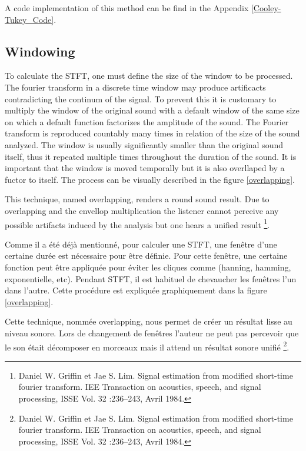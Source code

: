 A code implementation of this method can be find in the Appendix \ref{Cooley-Tukey_Code}.

\subsection{Windowing}

To calculate the STFT, one must define the size of the window to be processed. The fourier transform in a discrete time window may produce artificacts contradicting the continum of the signal. To prevent this it is customary to multiply the window of the original sound with a default window of the same size on which a default function factorizes the amplitude of the sound. The Fourier transform is reproduced countably many times in relation of the size of the sound analyzed. The window is usually significantly smaller than the original sound itself, thus it repeated multiple times throughout the duration of the sound. It is important that the window is moved temporally but it is also overllaped by a fuctor to itself. The process can be visually described in the figure \ref{overlapping}.

This technique, named overlapping, renders a round sound result. Due to overlapping and the envellop multiplication the listener cannot perceive any possible artifacts induced by the analysis but one hears a unified result \footnote{Daniel W. Griffin et Jae S. Lim. Signal estimation from modified short-time fourier transform. IEE Transaction on acoustics, speech, and signal processing, ISSE Vol. 32 :236–243, Avril 1984.}. 

 
Comme il a été déjà mentionné, pour calculer une STFT, une fenêtre d’une certaine durée est nécessaire pour être définie. Pour cette fenêtre, une certaine fonction peut être appliquée pour éviter les cliques comme (hanning, hamming, exponentielle, etc). Pendant STFT, il est habituel de
chevaucher les fenêtres l’un dans l’autre. Cette procédure est expliquée graphiquement dans la figure \ref{overlapping}.

Cette technique, nommée overlapping, nous permet de créer un résultat lisse au niveau sonore. Lors
de changement de fenêtres l’auteur ne peut pas percevoir que le son était décomposer en morceaux
mais il attend un résultat sonore unifié \footnote{Daniel W. Griffin et Jae S. Lim. Signal estimation from modified short-time fourier transform. IEE Transaction on acoustics, speech, and signal processing, ISSE Vol. 32 :236–243, Avril 1984.}. 

